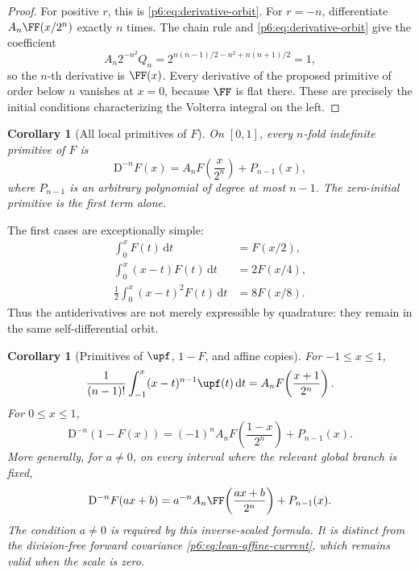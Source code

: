 \documentclass[11pt,oneside]{article}
\newtheorem{corollary}[theorem]{Corollary}
\theoremstyle{definition}
\theoremstyle{remark}
\newcommand{\dd}{\,\mathrm d}
\newcommand{\1}{\mathbf 1}
\begin{document}
\begin{proof}
For positive \(r\), this is \eqref{p6:eq:derivative-orbit}.  For \(r=-n\), differentiate
\(A_n\FF(x/2^n)\) exactly \(n\) times.  The chain rule and
\eqref{p6:eq:derivative-orbit} give the coefficient
\[
 A_n2^{-n^2}Q_n
 =2^{n(n-1)/2-n^2+n(n+1)/2}=1,
\]
so the \(n\)-th derivative is \(\FF(x)\).  Every derivative of the proposed primitive
of order below \(n\) vanishes at \(x=0\), because \(\FF\) is flat there.  These are
precisely the initial conditions characterizing the Volterra integral on the left.
\end{proof}

\begin{corollary}[All local primitives of \(F\)]
\label{p6:cor:F-primitives}
On \([0,1]\), every \(n\)-fold indefinite primitive of \(F\) is
\begin{equation}
 \mathrm D^{-n}F(x)=A_nF\!\left(\frac{x}{2^n}\right)+P_{n-1}(x), \label{p6:eq:F-nprimitive}
\end{equation}
where \(P_{n-1}\) is an arbitrary polynomial of degree at most \(n-1\).  The
zero-initial primitive is the first term alone.
\end{corollary}

The first cases are exceptionally simple:
\begin{align}
 \int_0^xF(t)\dd t&=F(x/2),                                      \label{p6:eq:F-first-primitive}\\
 \int_0^x(x-t)F(t)\dd t&=2F(x/4),                                \\
 \frac12\int_0^x(x-t)^2F(t)\dd t&=8F(x/8).
\end{align}
Thus the antiderivatives are not merely expressible by quadrature: they remain in the
same self-differential orbit.

\begin{corollary}[Primitives of \(\upf\), \(1-F\), and affine copies]
\label{p6:cor:other-primitives}
For \(-1\le x\le1\),
\begin{equation}
 \frac1{(n-1)!}\int_{-1}^x(x-t)^{n-1}\upf(t)\dd t
 =A_nF\!\left(\frac{x+1}{2^n}\right).                    \label{p6:eq:up-local-primitive}
\end{equation}
For \(0\le x\le1\),
\begin{equation}
 \mathrm D^{-n}(1-F(x))
 =(-1)^nA_nF\!\left(\frac{1-x}{2^n}\right)+P_{n-1}(x).   \label{p6:eq:one-minus-F}
\end{equation}
More generally, for \(a\ne0\), on every interval where the relevant global branch is fixed,
\begin{equation}
 \mathrm D^{-n}F(ax+b)
 =a^{-n}A_n\FF\!\left(\frac{ax+b}{2^n}\right)+P_{n-1}(x). \label{p6:eq:affine-primitive}
\end{equation}
The condition \(a\ne0\) is required by this inverse-scaled formula.  It is distinct from the
division-free forward covariance \eqref{p6:eq:lean-affine-current}, which remains valid when the
scale is zero.
\end{corollary}
\end{document}

